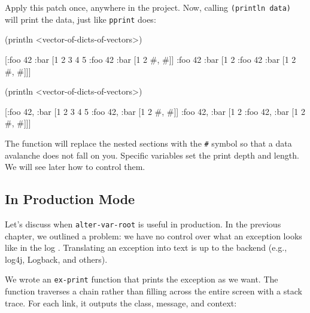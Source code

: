 Apply this patch once, anywhere in the project.
Now, calling \verb|(println data)| will print the data, just like \verb|pprint| does:

\ifx\DEVICETYPE\MOBILE

\begin{english}
  \begin{clojure}
(println <vector-of-dicts-of-vectors>)

[{:foo 42
  :bar [1 2 3 4 5 {:foo 42
                   :bar [1 2 {#, #}]}]}
 {:foo 42
  :bar [1 2 {:foo 42
             :bar [1 2 {#, #}]}]}]
  \end{clojure}
\end{english}

\else

\begin{english}
  \begin{clojure}
(println <vector-of-dicts-of-vectors>)

[{:foo 42, :bar [1 2 3 4 5 {:foo 42, :bar [1 2 {#, #}]}]}
 {:foo 42, :bar [1 2 {:foo 42, :bar [1 2 {#, #}]}]}]
  \end{clojure}
\end{english}

\fi

The function will replace the nested sections with the \verb|#| symbol so that a data avalanche does not fall on you.
Specific variables set the print depth and length.
We will see later how to control them.

\subsection{In Production Mode}

\label{install-logger}


Let's discuss when \verb|alter-var-root| is useful in production.
In the previous chapter, we outlined a problem: we have no control over what an exception looks like in the log .
Translating an exception into text is up to the backend (e.g., log4j, Logback, and others).

We wrote an \verb|ex-print| function that prints the exception as we want.
The function traverses a chain rather than filling across the entire screen with a stack trace.
For each link, it outputs the class, message, and context:

\ifx\DEVICETYPE\MOBILE

